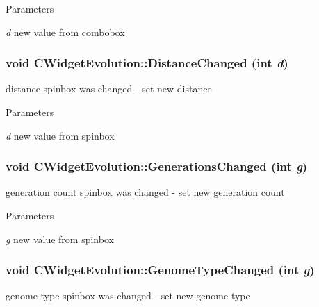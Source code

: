 \begin{DoxyParams}{Parameters}
\item[{\em d}]new value from combobox \end{DoxyParams}
\hypertarget{classCWidgetEvolution_a5e155a1df2cbf7ec7b4e0ac94d8596a2}{
\subsubsection[{DistanceChanged}]{\setlength{\rightskip}{0pt plus 5cm}void CWidgetEvolution::DistanceChanged (int {\em d})}}
\label{classCWidgetEvolution_a5e155a1df2cbf7ec7b4e0ac94d8596a2}
distance spinbox was changed -\/ set new distance


\begin{DoxyParams}{Parameters}
\item[{\em d}]new value from spinbox \end{DoxyParams}
\hypertarget{classCWidgetEvolution_a8a40de3276109d8b03dc02ef42d8961b}{
\subsubsection[{GenerationsChanged}]{\setlength{\rightskip}{0pt plus 5cm}void CWidgetEvolution::GenerationsChanged (int {\em g})}}
\label{classCWidgetEvolution_a8a40de3276109d8b03dc02ef42d8961b}
generation count spinbox was changed -\/ set new generation count


\begin{DoxyParams}{Parameters}
\item[{\em g}]new value from spinbox \end{DoxyParams}
\hypertarget{classCWidgetEvolution_a2748148f4fbf4dd9698bde0f9496ae8c}{
\subsubsection[{GenomeTypeChanged}]{\setlength{\rightskip}{0pt plus 5cm}void CWidgetEvolution::GenomeTypeChanged (int {\em g})}}
\label{classCWidgetEvolution_a2748148f4fbf4dd9698bde0f9496ae8c}
genome type spinbox was changed -\/ set new genome type


